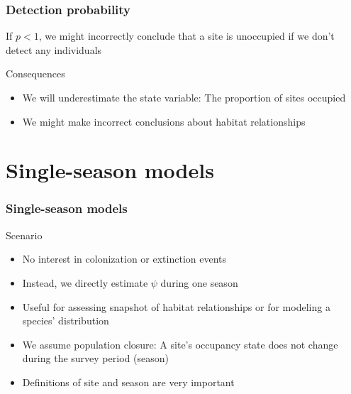 \documentclass[color=usenames,dvipsnames]{beamer}\usepackage[]{graphicx}\usepackage[]{xcolor}
\begin{document}





\begin{frame}
  \frametitle{Detection probability}
  \large
  {\centering If $p<1$, we might
    incorrectly conclude that a site is unoccupied if we don't detect
    any individuals \par}
  \pause
  \vspace{0.5cm}
  {%
    Consequences}
  \begin{itemize}[<+->]
    \item We will underestimate the state variable: The proportion of
      sites occupied
    \item We might make incorrect conclusions about habitat relationships
  \end{itemize}
\end{frame}







\section{Single-season models}




\begin{frame}
  \frametitle{Single-season models}
  \large
  {%
    Scenario}
  \large
  \begin{itemize}[<+->]
    \item No interest in colonization or extinction events
    \item Instead, we directly estimate $\psi$ during one season
    \item Useful for assessing snapshot of habitat relationships or
      for modeling a species' distribution
    \item We assume \alert{population closure}: A site's occupancy
      state does not change during the survey period (season)
    \item Definitions of site and season are very important
  \end{itemize}
\end{frame}
\end{document}
